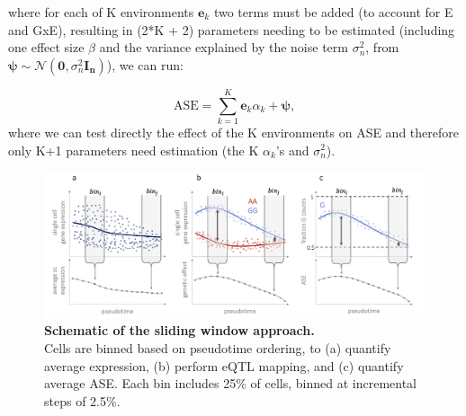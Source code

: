 \begin{Comment}
where for each of K environments $\mathbf{e}_k$ two terms must be added (to account for E and GxE), resulting in (2*K + 2) parameters needing to be estimated (including one effect size $\beta$ and the variance explained by the noise term $\sigma_n^2$, from $\boldsymbol{\psi} \sim \mathcal{N}(\mathbf{0}, \sigma_n^2\mathbf{I_n})$), we can run:

\begin{equation*}
    \mathrm{ASE} = \sum_{k=1}^{K} \mathbf{e}_k\alpha_k + \boldsymbol{\psi}, 
\end{equation*}
where we can test directly the effect of the K environments on ASE and therefore only K+1 parameters need estimation (the K $\alpha_k$'s and $\sigma_n^2$).

\end{Comment}

\begin{figure}[h]
\centering
\includegraphics[width=15.5cm]{Chapter4/Fig/endodiff_running_average.png}
\caption[Schematic of the sliding window approach]{\textbf{Schematic of the sliding window approach.}\\
Cells are binned based on pseudotime ordering, to (a) quantify average expression, (b) perform eQTL mapping, and (c) quantify average ASE.
Each bin includes 25\% of cells, binned at incremental steps of 2.5\%.}
\label{fig:endodiff_sliding_window}
\end{figure}

